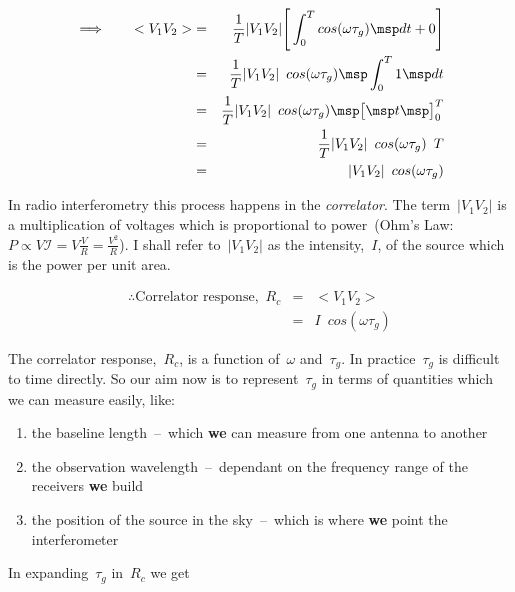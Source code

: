 \begin{eqnarray}
  \label{eq:5}
  \implies \qquad <V_1V_2> &=& \frac{1}{T} |V_1V_2| \Bigg [\int _0^T cos(\omega \tau _g) \msp dt + 0 \Bigg ] \nonumber \\
           &=& \frac{1}{T} |V_1V_2| \enspace cos(\omega \tau _g) \msp \int _0^T 1 \msp dt \nonumber \\
           &=& \frac{1}{T} |V_1V_2| \enspace cos(\omega \tau _g) \msp \big[\msp t \msp \big]_0^T \nonumber \\
           &=& \frac{1}{T} |V_1V_2| \enspace cos(\omega \tau _g) \enspace T \nonumber \\
           &=& |V_1V_2| \enspace cos(\omega \tau _g)
\end{eqnarray}

In radio interferometry this process happens in the \emph{correlator}. The term~$|V_1V_2|$ is a multiplication of voltages which is proportional to power~(Ohm's Law: $P \propto V\mathcal{I} = V\frac{V}{R} = \frac{V^2}{R}$). I shall refer to~$|V_1V_2|$ as the intensity,~$I$, of the source which is the power per unit area.

\begin{eqnarray}
  \label{eq:6}
  \therefore \mbox{Correlator response,} \enspace R_c &=& <V_1V_2> \nonumber \\
                                                      &=& I \enspace cos(\omega \tau _g)
\end{eqnarray}

The correlator response,~$R_c$, is a function of~$\omega $ and~$\tau _g$. In practice~$\tau _g$ is difficult to time directly. So our aim now is to represent~$\tau _g$ in terms of quantities which we can measure easily, like:

\begin{enumerate}
  \itemsep-0.5cm
\item the baseline length~--~which \textbf{we} can measure from one antenna to another \\
\item the observation wavelength~--~dependant on the frequency range of the receivers \textbf{we} build \\
\item the position of the source in the sky~--~which is where \textbf{we} point the interferometer
\end{enumerate}

In expanding~$\tau _g$ in~$R_c$ we get

